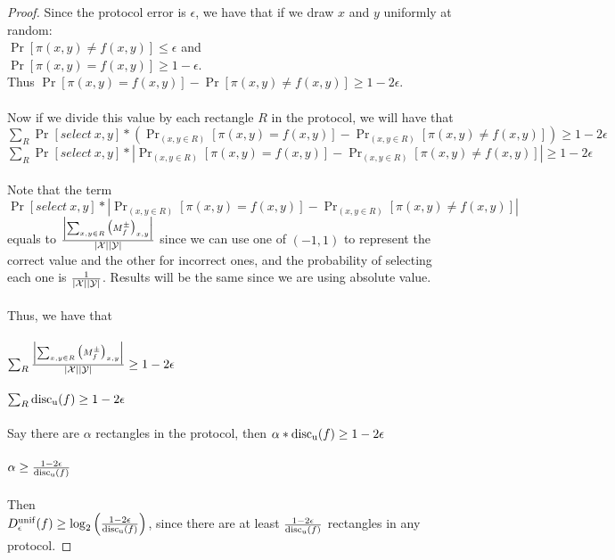 \begin{proof}
	Since the protocol error is $\epsilon$, we have that if we draw  $x$ and $y$ uniformly at random: \\
	$\Pr[ \pi(x,y) \neq f(x,y)] \le \epsilon$ and\\
	$\Pr[ \pi(x,y) = f(x,y)] \ge 1-\epsilon$. \\
	Thus $\Pr[ \pi(x,y) = f(x,y)] - \Pr[ \pi(x,y) \neq f(x,y)] \ge 1-2\epsilon$. \\
	\\
	Now if we divide this value by each rectangle $R$ in the protocol, we will have that \\
	$\sum_{R} \Pr[select\ x,y] * (\Pr_{(x,y \in R)}[ \pi(x,y) = f(x,y)] - \Pr_{(x,y \in R)}[ \pi(x,y) \neq f(x,y)]) \ge 1-2\epsilon$ \\
	$\sum_{R} \Pr[select\ x,y] * |\Pr_{(x,y \in R)}[ \pi(x,y) = f(x,y)] - \Pr_{(x,y \in R)}[ \pi(x,y) \neq f(x,y)]| \ge 1-2\epsilon$ \\
	\\
	Note that the term  $\Pr[select\ x,y] * |\Pr_{(x,y \in R)}[ \pi(x,y) = f(x,y)] - \Pr_{(x,y \in R)}[ \pi(x,y) \neq f(x,y)]|$ equals to $\frac{\left| \sum_{x,y \in R} \big(M^{\pm}_f\big)_{x,y} \right|}{|\mathcal{X}||\mathcal{Y}|}$ since we can use one of $(-1,1)$ to represent the correct value and the other for incorrect ones, and the probability of selecting each one is $\frac{1}{|\mathcal{X}||\mathcal{Y}|}$. Results will be the same since we are using absolute value. \\
	\\
	Thus, we have that \\
	\\
	$\sum_{R} \frac{\left| \sum_{x,y \in R} \big(M^{\pm}_f\big)_{x,y} \right|}{|\mathcal{X}||\mathcal{Y}|} \ge 1-2\epsilon$\\
	\\
	$\sum_{R} \mathrm{disc_u}(f) \ge 1-2\epsilon$\\
	\\
	Say there are $\alpha$ rectangles in the protocol, then
	$\alpha * \mathrm{disc_u}(f) \ge 1-2\epsilon$ \\ 
	\\
	$\alpha \ge \frac{1-2\epsilon}{\mathrm{disc_u}(f)}$ \\
	\\
	Then\\
	$D_\epsilon^{\mathrm{unif}}(f) \ge \log_2 \left( \frac{1-2\epsilon}{\mathrm{disc_u}(f)} \right)$, since there are at least $\frac{1-2\epsilon}{\mathrm{disc_u}(f)}$ rectangles in any protocol.
\end{proof}


